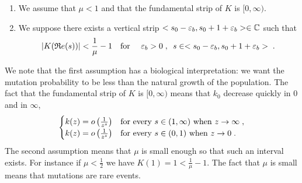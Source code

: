 \documentclass[11pt]{amsart}
\renewcommand{\Re}{\mathfrak{R}e}
\newcommand{\blue}[1]{\textcolor{blue}{#1}}
\newcommand{\ndr}[1]{\textcolor{brown}{[#1]}}
\begin{document}
\begin{hypothesis}\label{hyp:boundK} \mbox{}
    \begin{enumerate}
        \item We assume that $\mu < 1$ and that the fundamental strip of $K$ is $[0, \infty)$.  
        \item We suppose there exists a vertical strip $<s_0-\varepsilon_b, s_0+1+\varepsilon_b> \in \mathbb{C}$ such that 
        $$|K(\Re(s))| < \frac{1}{\mu} - 1
        \mtext{for } \varepsilon_b > 0 \eqsepv s \in <s_0-\varepsilon_b, s_0+1+\varepsilon_b>\eqfinp$$ 
    \end{enumerate}
\end{hypothesis}
We note that the first assumption has a biological interpretation: we want the mutation probability to be less than the natural growth of the population. The fact that the  fundamental strip of $K$ is $[0, \infty)$ means that $k_0$ decrease quickly in $0$ and in $\infty$, \ie 
\begin{equation*}
    \begin{cases}
        k(z) = o\left( \frac{1}{z^s}\right) & \text{for every } s \in (1, \infty) \text{ when } z \to \infty \; ,\\
        k(z) = o\left( \frac{1}{z^s}\right) & \text{for every } s \in (0, 1) \text{ when } z \to 0 \; .
    \end{cases}
\end{equation*}
The second assumption means that $\mu$ is small enough so that  such an interval exists. For instance if $\mu<\frac{1}{2}$ we have $K(1)=1<\frac{1}{\mu}-1$. The fact that $\mu$ is small means that mutations are rare events. 
\end{document}
